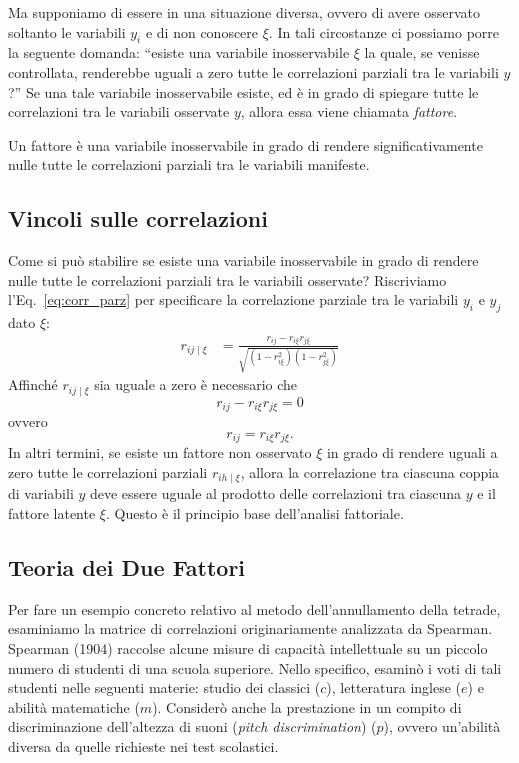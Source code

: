 Ma supponiamo di essere in una situazione diversa, ovvero di avere osservato soltanto le variabili $y_i$ e di non conoscere $\xi$. 
In tali circostanze ci possiamo porre la seguente domanda: \enquote{esiste una variabile inosservabile $\xi$ la quale, se venisse controllata, renderebbe uguali a zero tutte le correlazioni parziali tra le variabili $y$?}
Se una tale variabile inosservabile esiste, ed è in grado di spiegare tutte le correlazioni tra le variabili osservate $y$, allora essa viene chiamata \textit{fattore}. 
\begin{defn}
\label{fattore_latente}
Un fattore è una variabile inosservabile in grado di rendere significativamente nulle tutte le correlazioni parziali tra le variabili manifeste.
\end{defn}


\subsection{Vincoli sulle correlazioni}

Come si può stabilire se esiste una variabile inosservabile in grado di rendere nulle tutte le correlazioni parziali tra le variabili osservate? 
Riscriviamo l'Eq.~\eqref{eq:corr_parz} per specificare la correlazione parziale tra le variabili $y_i$ e $y_j$ dato $\xi$:
\begin{align}
  r_{ij \mid \xi} &= \frac{r_{ij} - r_{i\xi}r_{j\xi}}
  {\sqrt{(1-r_{i\xi}^2)(1-r_{j\xi}^2)}} 
\end{align}
Affinché $r_{ij \mid \xi}$ sia uguale a zero è necessario che
\[
r_{ij} - r_{i\xi}r_{j\xi}=0
\]
ovvero
\begin{equation}
r_{ij} = r_{i\xi}r_{j\xi}.
\end{equation}
In altri termini, se esiste un fattore non osservato $\xi$ in grado di rendere 
uguali a zero tutte le correlazioni parziali $r_{ih \mid \xi}$, allora la
correlazione tra ciascuna coppia di variabili $y$ deve essere uguale
al prodotto delle correlazioni tra ciascuna $y$ e il fattore latente $\xi$.
Questo è il principio base dell'analisi fattoriale. 
  

\subsection{Teoria dei Due Fattori}

Per fare un esempio concreto relativo al metodo dell'annullamento della tetrade, esaminiamo la matrice di correlazioni originariamente analizzata da Spearman.
Spearman (1904) raccolse alcune misure di capacità intellettuale su un piccolo
numero di studenti di una scuola superiore.
Nello specifico, esaminò i voti di tali studenti nelle seguenti materie: studio dei classici ($c$), letteratura inglese ($e$) e abilità matematiche ($m$).
Considerò anche la prestazione in un compito di discriminazione dell'altezza di suoni (\textit{pitch discrimination}) ($p$), ovvero un'abilità diversa da quelle richieste nei test scolastici.  

